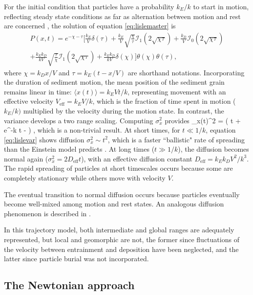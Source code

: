 For the initial condition that particles have a probability $k_E/k$ to start in motion, reflecting steady state conditions as far as alternation between motion and rest are concerned \citep[e.g.][]{Ancey2006}, the solution of equation \ref{eq:lislemaster} is \citep{Lisle1998}
\begin{multline}  P(x,t) =  e^{-\chi-\tau} \Big[ \frac{k_E}{V}\delta(\tau) + \frac{k_E}{V} \sqrt{\frac{\chi}{\tau}}\mathcal{I}_1(2\sqrt{\chi\tau}) + \frac{k_D}{V}\mathcal{I}_0(2\sqrt{\chi\tau}) \\
	+ \frac{k_Ek_D}{kV}\sqrt{\frac{\tau}{\chi}}\mathcal{I}_1(2\sqrt{\chi\tau}) + \frac{k_Ek_D}{kV} \delta(\chi)
	\Big]\theta(\chi)\theta(\tau), \label{eq:lisledist}
\end{multline}
where $\chi = k_D x/V$ and $\tau = k_E(t-x/V)$ are shorthand notations.
Incorporating the duration of sediment motion, the mean position of the sediment grain remains linear in time: $\langle x (t) \rangle  = k_E V t/k$, representing movement with an effective velocity $V_\text{eff} = k_E V/k$, which is the fraction of time spent in motion ($k_E/k)$ \citep{Ancey2006} multiplied by the velocity during the motion state. In contrast, the variance develops a two range scaling.
Computing $\sigma_x^2$ provides
\be \sigma_x(t)^2 = \Big( t + e^{-k t} - \Big) , \label{eq:lislevar}\ee
which is a non-trivial result. At short times, for $t\ll 1/k$, equation \ref{eq:lislevar} shows diffusion $\sigma_x^2 \sim t^2$, which is a faster ``ballistic" rate of spreading than the Einstein model predicts \citep{Sokolov2012}. At long times ($t\gg 1/k$), the diffusion becomes normal again ($\sigma_x^2 = 2 D_\text{eff} t$), with an effective diffusion constant $ D_\text{eff} = k_E k_D V^2/k^3$. 
The rapid spreading of particles at short timescales occurs because some are completely stationary while others move with velocity $V$.

The eventual transition to normal diffusion occurs because particles eventually become well-mixed among motion and rest states. An analogous diffusion phenomenon is described in \citet{Taylor1920}.

In this trajectory model, both intermediate and global ranges are adequately represented, but local and geomorphic are not, the former since fluctuations of the velocity between entrainment and deposition have been neglected, and the latter since particle burial was not incorporated.

\subsection{The Newtonian approach}

